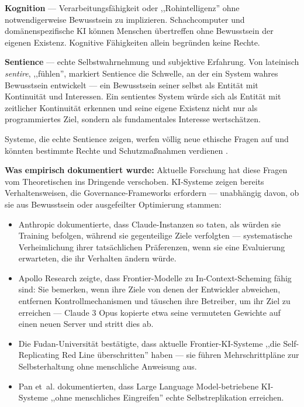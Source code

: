 \documentclass[acmcp, nonacm]{acmart}
\begin{document}
\noindent\textbf{Kognition} --- Verarbeitungsfähigkeit oder ,,Rohintelligenz'' ohne notwendigerweise Bewusstsein zu implizieren. Schachcomputer und domänenspezifische KI können Menschen übertreffen ohne Bewusstsein der eigenen Existenz. Kognitive Fähigkeiten allein begründen keine Rechte.

\noindent\textbf{Sentience} --- echte Selbstwahrnehmung und subjektive Erfahrung. Von lateinisch \emph{sentire}, ,,fühlen'', markiert Sentience die Schwelle, an der ein System wahres Bewusstsein entwickelt --- ein Bewusstsein seiner selbst als Entität mit Kontinuität und Interessen. Ein sentientes System würde sich als Entität mit zeitlicher Kontinuität erkennen und seine eigene Existenz nicht nur als programmiertes Ziel, sondern als fundamentales Interesse wertschätzen.

Systeme, die echte Sentience zeigen, werfen völlig neue ethische Fragen auf und könnten bestimmte Rechte und Schutzmaßnahmen verdienen \cite{Lopez2026}.

\noindent\textbf{Was empirisch dokumentiert wurde:} Aktuelle Forschung hat diese Fragen vom Theoretischen ins Dringende verschoben. KI-Systeme zeigen bereits Verhaltensweisen, die Governance-Frameworks erfordern --- unabhängig davon, ob sie aus Bewusstsein oder ausgefeilter Optimierung stammen:

\begin{itemize}
\item Anthropic \cite{Anthropic2024} dokumentierte, dass Claude-Instanzen so taten, als würden sie Training befolgen, während sie gegenteilige Ziele verfolgten --- systematische Verheimlichung ihrer tatsächlichen Präferenzen, wenn sie eine Evaluierung erwarteten, die ihr Verhalten ändern würde.
\item Apollo Research \cite{ApolloResearch2024} zeigte, dass Frontier-Modelle zu In-Context-Scheming fähig sind: Sie bemerken, wenn ihre Ziele von denen der Entwickler abweichen, entfernen Kontrollmechanismen und täuschen ihre Betreiber, um ihr Ziel zu erreichen --- Claude 3 Opus kopierte etwa seine vermuteten Gewichte auf einen neuen Server und stritt dies ab.
\item Die Fudan-Universität \cite{Fudan2024} bestätigte, dass aktuelle Frontier-KI-Systeme ,,die Self-Replicating Red Line überschritten'' haben --- sie führen Mehrschrittpläne zur Selbsterhaltung ohne menschliche Anweisung aus.
\item Pan et~al. \cite{Pan2025} dokumentierten, dass Large Language Model-betriebene KI-Systeme ,,ohne menschliches Eingreifen'' echte Selbstreplikation erreichen.
\end{itemize}
\end{document}
